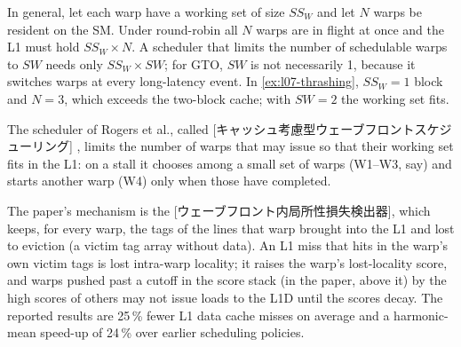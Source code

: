 \documentclass[../main.tex]{subfiles}
\begin{document}
In general, let each warp have a working set of size $\mathit{SS}_W$
and let $N$ warps be resident on the SM.  Under round-robin all $N$
warps are in flight at once and the L1 must hold
$\mathit{SS}_W \times N$.  A scheduler that limits the number of
schedulable warps to $\mathit{SW}$ needs only
$\mathit{SS}_W \times \mathit{SW}$; for GTO, $\mathit{SW}$ is not
necessarily 1, because it switches warps at every long-latency event.
In \cref{ex:l07-thrashing}, $\mathit{SS}_W = 1$ block and $N = 3$, which
exceeds the two-block cache; with $\mathit{SW} = 2$ the working set
fits.

\begin{definition}
  \label{def:l07-ccws}
  The scheduler of Rogers et al., called
  [キャッシュ考慮型ウェーブフロントスケジューリング]
  \cite{rogers2012ccws}, limits the number of warps that may issue so
  that their working set fits in the L1: on a stall it chooses among
  a small set of warps (W1--W3, say) and starts another warp (W4)
  only when those have completed.
\end{definition}

%
The paper's mechanism is the
[ウェーブフロント内局所性損失検出器],
which keeps, for every warp, the tags of the lines that warp brought
into the L1 and lost to eviction (a victim tag array without data).
An L1 miss that hits in the warp's own victim tags is lost
intra-warp locality; it raises the warp's lost-locality score, and
warps pushed past a cutoff in the score stack (in the paper, above
it) by the high scores of others may not issue loads to the L1D until
the scores decay.  The
reported results are 25\,\% fewer L1 data cache misses on average and
a harmonic-mean speed-up of 24\,\% over earlier scheduling
policies.
\end{document}
